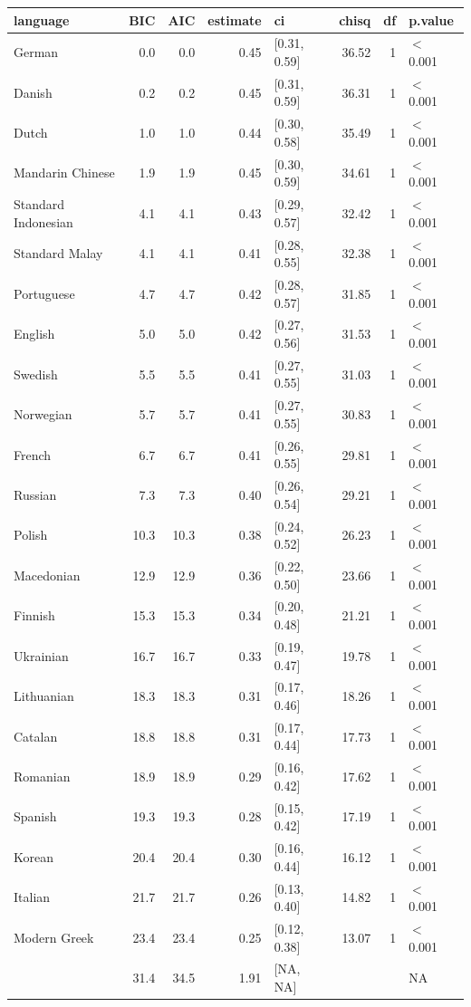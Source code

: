 \begin{table}[ht]
\centering
\begin{tabular}{lrrrlrrl}
  \hline
language & BIC & AIC & estimate & ci & chisq & df & p.value \\ 
  \hline
German & 0.0 & 0.0 & 0.45 & [0.31, 0.59] & 36.52 & 1 & $<$ 0.001 \\ 
  Danish & 0.2 & 0.2 & 0.45 & [0.31, 0.59] & 36.31 & 1 & $<$ 0.001 \\ 
  Dutch & 1.0 & 1.0 & 0.44 & [0.30, 0.58] & 35.49 & 1 & $<$ 0.001 \\ 
  Mandarin Chinese & 1.9 & 1.9 & 0.45 & [0.30, 0.59] & 34.61 & 1 & $<$ 0.001 \\ 
  Standard Indonesian & 4.1 & 4.1 & 0.43 & [0.29, 0.57] & 32.42 & 1 & $<$ 0.001 \\ 
  Standard Malay & 4.1 & 4.1 & 0.41 & [0.28, 0.55] & 32.38 & 1 & $<$ 0.001 \\ 
  Portuguese & 4.7 & 4.7 & 0.42 & [0.28, 0.57] & 31.85 & 1 & $<$ 0.001 \\ 
  English & 5.0 & 5.0 & 0.42 & [0.27, 0.56] & 31.53 & 1 & $<$ 0.001 \\ 
  Swedish & 5.5 & 5.5 & 0.41 & [0.27, 0.55] & 31.03 & 1 & $<$ 0.001 \\ 
  Norwegian & 5.7 & 5.7 & 0.41 & [0.27, 0.55] & 30.83 & 1 & $<$ 0.001 \\ 
  French & 6.7 & 6.7 & 0.41 & [0.26, 0.55] & 29.81 & 1 & $<$ 0.001 \\ 
  Russian & 7.3 & 7.3 & 0.40 & [0.26, 0.54] & 29.21 & 1 & $<$ 0.001 \\ 
  Polish & 10.3 & 10.3 & 0.38 & [0.24, 0.52] & 26.23 & 1 & $<$ 0.001 \\ 
  Macedonian & 12.9 & 12.9 & 0.36 & [0.22, 0.50] & 23.66 & 1 & $<$ 0.001 \\ 
  Finnish & 15.3 & 15.3 & 0.34 & [0.20, 0.48] & 21.21 & 1 & $<$ 0.001 \\ 
  Ukrainian & 16.7 & 16.7 & 0.33 & [0.19, 0.47] & 19.78 & 1 & $<$ 0.001 \\ 
  Lithuanian & 18.3 & 18.3 & 0.31 & [0.17, 0.46] & 18.26 & 1 & $<$ 0.001 \\ 
  Catalan & 18.8 & 18.8 & 0.31 & [0.17, 0.44] & 17.73 & 1 & $<$ 0.001 \\ 
  Romanian & 18.9 & 18.9 & 0.29 & [0.16, 0.42] & 17.62 & 1 & $<$ 0.001 \\ 
  Spanish & 19.3 & 19.3 & 0.28 & [0.15, 0.42] & 17.19 & 1 & $<$ 0.001 \\ 
  Korean & 20.4 & 20.4 & 0.30 & [0.16, 0.44] & 16.12 & 1 & $<$ 0.001 \\ 
  Italian & 21.7 & 21.7 & 0.26 & [0.13, 0.40] & 14.82 & 1 & $<$ 0.001 \\ 
  Modern Greek & 23.4 & 23.4 & 0.25 & [0.12, 0.38] & 13.07 & 1 & $<$ 0.001 \\ 
   & 31.4 & 34.5 & 1.91 & [NA, NA] &  &  & NA \\ 
   \hline
\end{tabular}
\end{table}
